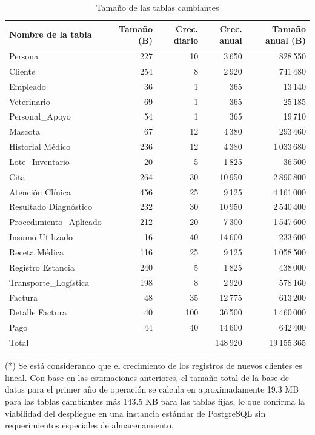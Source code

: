 \begin{table}[H]
\centering
\footnotesize
\begin{tabular}{lrrrr}
\toprule
\textbf{Nombre de la tabla} & \textbf{Tamaño (B)} & \textbf{Crec. diario} & \textbf{Crec. anual} & \textbf{Tamaño anual (B)} \\
\midrule
Persona & 227 & 10 & 3\,650 & 828\,550 \\
Cliente & 254 & 8 & 2\,920 & 741\,480 \\
Empleado & 36 & 1 & 365 & 13\,140 \\
Veterinario & 69 & 1 & 365 & 25\,185 \\
Personal\_Apoyo & 54 & 1 & 365 & 19\,710 \\
Mascota & 67 & 12 & 4\,380 & 293\,460 \\
Historial Médico & 236 & 12 & 4\,380 & 1\,033\,680 \\
Lote\_Inventario & 20 & 5 & 1\,825 & 36\,500 \\
Cita & 264 & 30 & 10\,950 & 2\,890\,800 \\
Atención Clínica & 456 & 25 & 9\,125 & 4\,161\,000 \\
Resultado Diagnóstico & 232 & 30 & 10\,950 & 2\,540\,400 \\
Procedimiento\_Aplicado & 212 & 20 & 7\,300 & 1\,547\,600 \\
Insumo Utilizado & 16 & 40 & 14\,600 & 233\,600 \\
Receta Médica & 116 & 25 & 9\,125 & 1\,058\,500 \\
Registro Estancia & 240 & 5 & 1\,825 & 438\,000 \\
Transporte\_Logística & 198 & 8 & 2\,920 & 578\,160 \\
Factura & 48 & 35 & 12\,775 & 613\,200 \\
Detalle Factura & 40 & 100 & 36\,500 & 1\,460\,000 \\
Pago & 44 & 40 & 14\,600 & 642\,400 \\
\midrule
Total & & & 148\,920 & 19\,155\,365 \\
\bottomrule
\end{tabular}
\caption{Tamaño de las tablas cambiantes}
\end{table}

(*) Se está considerando que el crecimiento de los registros de nuevos clientes es lineal. Con base en las estimaciones anteriores, el tamaño total de la base de datos para el primer año de operación se calcula en aproximadamente 19.3 MB para las tablas cambiantes más 143.5 KB para las tablas fijas, lo que confirma la viabilidad del despliegue en una instancia estándar de PostgreSQL sin requerimientos especiales de almacenamiento.

